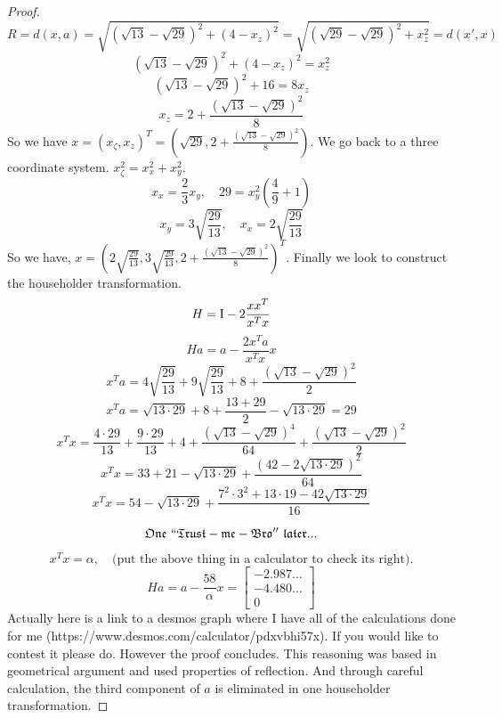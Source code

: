 \documentclass{article}
\begin{document}
\begin{enumerate}
\begin{enumerate}
\begin{proof}
    \[
        R = d(x, a) = \sqrt{(\sqrt{13} - \sqrt{29})^2 + (4 - x_z)^2} = \sqrt{(\sqrt{29} - \sqrt{29})^2 + x_z^2} = d(x', x)
    \]
    \[
        (\sqrt{13} - \sqrt{29})^2 + (4 - x_z)^2 = x_z^2
    \]
    \[
        (\sqrt{13} - \sqrt{29})^2 + 16 = 8x_z
    \]
    \[
        x_z = 2 + \frac{(\sqrt{13} - \sqrt{29})^2}{8} 
    \]
    So we have $x = (x_{\zeta}, x_z)^T = \left(\sqrt{29}, 2 + \frac{(\sqrt{13} - \sqrt{29})^2}{8}\right)$. We go back to a three coordinate system. $x_{\zeta}^2 = x_x^2 + x_y^2$. 
    \[
        x_x = \frac{2}{3}x_y, \quad 29 = x_y^2\left(\frac{4}{9} + 1\right)
    \]
    \[
        x_y = 3\sqrt{\frac{29}{13}}, \quad x_x = 2\sqrt{\frac{29}{13}}
    \]
    So we have, $x = \left(2\sqrt{\frac{29}{13}}, 3\sqrt{\frac{29}{13}}, 2 + \frac{(\sqrt{13} - \sqrt{29})^2}{8}\right)^T$. Finally we look to construct the householder transformation.
    \[
        H = \mathrm{I} - 2\frac{xx^T}{x^Tx}
    \]
    \[
        Ha = a - \frac{2x^Ta}{x^Tx}x
    \]
    \[
        x^Ta = 4\sqrt{\frac{29}{13}} + 9\sqrt{\frac{29}{13}} + 8 + \frac{(\sqrt{13} - \sqrt{29})^2}{2}
    \]
    \[
        x^Ta = \sqrt{13\cdot29} + 8 + \frac{13 + 29}{2} - \sqrt{13\cdot29} = 29 
    \]
    \[
        x^Tx = \frac{4\cdot29}{13} + \frac{9\cdot29}{13} + 4 + \frac{(\sqrt{13} - \sqrt{29})^4}{64} + \frac{(\sqrt{13} - \sqrt{29})^2}{2}
    \]
    \[
        x^Tx = 33 + 21 - \sqrt{13\cdot29} + \frac{(42 - 2\sqrt{13\cdot29})^2}{64}
    \]
    \[
        x^Tx = 54 - \sqrt{13\cdot29} + \frac{7^2\cdot3^2 + 13\cdot19 - 42\sqrt{13\cdot29}}{16}
    \]
    \begin{center}
        \[\mathfrak{One \text{ } ``Trust-me-Bro''\text{ } later...}\]
    \end{center}
    \[
        x^Tx = \alpha, \quad \text{(put the above thing in a calculator to check its right).}
    \]
    \[
        Ha = a - \frac{58}{\alpha}x = \left[\begin{array}{c}-2.987\dotsc \\ -4.480\dotsc \\ 0 \end{array}\right]
    \]
    Actually here is a link to a desmos graph where I have all of the calculations done for me (https://www.desmos.com/calculator/pdxvbhi57x). If you would like to contest it please do. However the proof concludes. This reasoning was based in geometrical argument and used properties of reflection. And through careful calculation, the third component of $a$ is eliminated in one householder transformation. 

\end{proof}


\end{enumerate}
\end{enumerate}
\end{document}
